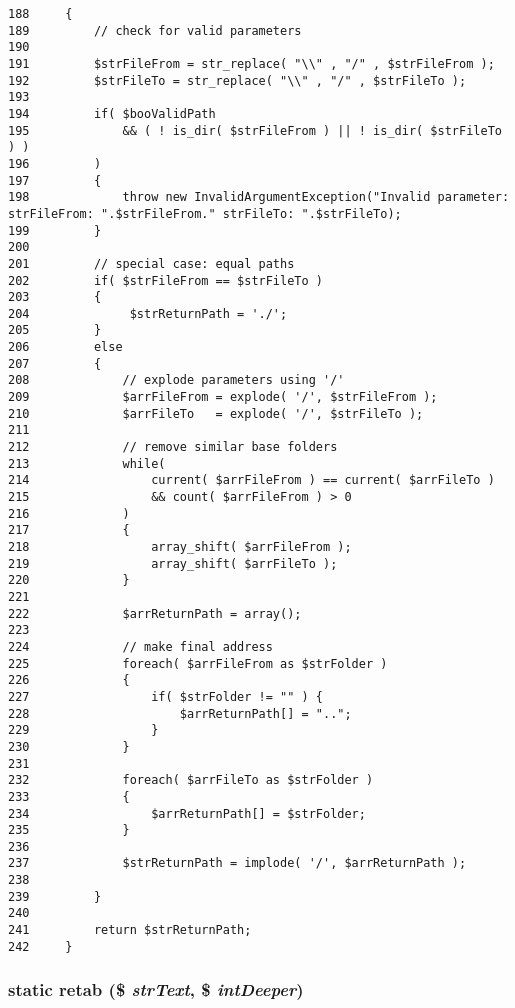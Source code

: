 \begin{Code}\begin{verbatim}188     {
189         // check for valid parameters
190 
191         $strFileFrom = str_replace( "\\" , "/" , $strFileFrom );
192         $strFileTo = str_replace( "\\" , "/" , $strFileTo );
193 
194         if( $booValidPath
195             && ( ! is_dir( $strFileFrom ) || ! is_dir( $strFileTo ) )
196         )
197         {
198             throw new InvalidArgumentException("Invalid parameter: strFileFrom: ".$strFileFrom." strFileTo: ".$strFileTo);
199         }
200 
201         // special case: equal paths
202         if( $strFileFrom == $strFileTo )
203         {
204              $strReturnPath = './';
205         }
206         else
207         {
208             // explode parameters using '/'
209             $arrFileFrom = explode( '/', $strFileFrom );
210             $arrFileTo   = explode( '/', $strFileTo );
211 
212             // remove similar base folders
213             while(
214                 current( $arrFileFrom ) == current( $arrFileTo )
215                 && count( $arrFileFrom ) > 0
216             )
217             {
218                 array_shift( $arrFileFrom );
219                 array_shift( $arrFileTo );
220             }
221 
222             $arrReturnPath = array();
223 
224             // make final address
225             foreach( $arrFileFrom as $strFolder )
226             {
227                 if( $strFolder != "" ) {
228                     $arrReturnPath[] = "..";
229                 }
230             }
231 
232             foreach( $arrFileTo as $strFolder )
233             {
234                 $arrReturnPath[] = $strFolder;
235             }
236 
237             $strReturnPath = implode( '/', $arrReturnPath );
238 
239         }
240 
241         return $strReturnPath;
242     }
\end{verbatim}
\end{Code}


\hypertarget{class_coruja_string_manipulation_edaa7f09264ccb66dfd8f12cb8c4b8f6}{
\subsubsection[{retab}]{\setlength{\rightskip}{0pt plus 5cm}static retab (\$ {\em strText}, \/  \$ {\em intDeeper})}}
\label{class_coruja_string_manipulation_edaa7f09264ccb66dfd8f12cb8c4b8f6}





